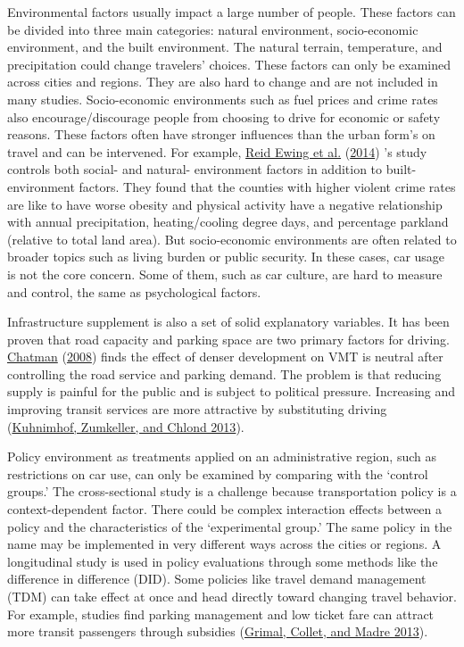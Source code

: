 \documentclass[
  12pt,
]{article}
\begin{document}
Environmental factors usually impact a large number of people. These factors can be divided into three main categories: natural environment, socio-economic environment, and the built environment. The natural terrain, temperature, and precipitation could change travelers' choices. These factors can only be examined across cities and regions. They are also hard to change and are not included in many studies. Socio-economic environments such as fuel prices and crime rates also encourage/discourage people from choosing to drive for economic or safety reasons. These factors often have stronger influences than the urban form's on travel and can be intervened. For example, \protect\hyperlink{ref-ewingRelationshipUrbanSprawl2014}{Reid Ewing et al.} (\protect\hyperlink{ref-ewingRelationshipUrbanSprawl2014}{2014}) 's study controls both social- and natural- environment factors in addition to built-environment factors. They found that the counties with higher violent crime rates are like to have worse obesity and physical activity have a negative relationship with annual precipitation, heating/cooling degree days, and percentage parkland (relative to total land area). But socio-economic environments are often related to broader topics such as living burden or public security. In these cases, car usage is not the core concern. Some of them, such as car culture, are hard to measure and control, the same as psychological factors.

Infrastructure supplement is also a set of solid explanatory variables. It has been proven that road capacity and parking space are two primary factors for driving. \protect\hyperlink{ref-chatmanDeconstructingDevelopmentDensity2008}{Chatman} (\protect\hyperlink{ref-chatmanDeconstructingDevelopmentDensity2008}{2008}) finds the effect of denser development on VMT is neutral after controlling the road service and parking demand. The problem is that reducing supply is painful for the public and is subject to political pressure. Increasing and improving transit services are more attractive by substituting driving (\protect\hyperlink{ref-kuhnimhofWhoMadePeak2013}{Kuhnimhof, Zumkeller, and Chlond 2013}).

Policy environment as treatments applied on an administrative region, such as restrictions on car use, can only be examined by comparing with the `control groups.' The cross-sectional study is a challenge because transportation policy is a context-dependent factor. There could be complex interaction effects between a policy and the characteristics of the `experimental group.' The same policy in the name may be implemented in very different ways across the cities or regions. A longitudinal study is used in policy evaluations through some methods like the difference in difference (DID). Some policies like travel demand management (TDM) can take effect at once and head directly toward changing travel behavior. For example, studies find parking management and low ticket fare can attract more transit passengers through subsidies (\protect\hyperlink{ref-grimalStagnationIndividualCar2013}{Grimal, Collet, and Madre 2013}).
\end{document}

